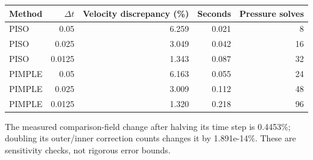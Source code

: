 \begin{center}\small\begin{tabular}{lrrrr}\toprule
Method & $\Delta t$ & Velocity discrepancy (\%) & Seconds & Pressure solves\\\midrule
PISO & 0.05 & 6.259 & 0.021 & 8\\
PISO & 0.025 & 3.049 & 0.042 & 16\\
PISO & 0.0125 & 1.343 & 0.087 & 32\\
PIMPLE & 0.05 & 6.163 & 0.055 & 24\\
PIMPLE & 0.025 & 3.009 & 0.112 & 48\\
PIMPLE & 0.0125 & 1.320 & 0.218 & 96\\
\bottomrule\end{tabular}\end{center}
The measured comparison-field change after halving its time step is 0.4453\%; doubling its outer/inner correction counts changes it by 1.891e-14\%. These are sensitivity checks, not rigorous error bounds.
